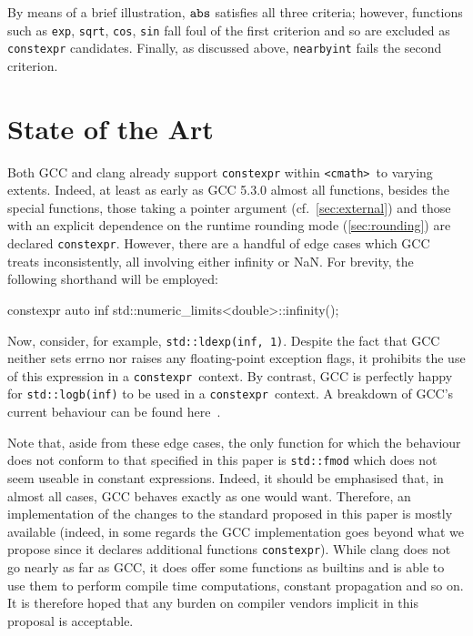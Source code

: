 \documentclass[prd,twocolumn,amsmath,amssymb,nofootinbib,eqsecnum]{revtex4-1}
\newcommand{\constexpr}{\code{constexpr}\xspace}
\newcommand{\code}[1]{{\tt #1}}
\newcommand{\header}[1]{{\tt <#1>}}
\newcommand{\cmath}{\header{cmath}}
\begin{document}
By means of a brief illustration, $\code{abs}$ satisfies all three criteria; however, functions such as 
\code{exp}, \code{sqrt}, \code{cos}, \code{sin} fall foul of the first criterion and so are excluded as 
\constexpr candidates. Finally, as discussed above, \code{nearbyint} fails the second criterion.


\section{State of the Art}

Both GCC and clang already support \constexpr within \cmath\ to varying extents. 
Indeed, at least as early as GCC 5.3.0 almost all functions, besides the special functions, those taking a pointer argument
(cf.~\ref{sec:external}) and those with an explicit dependence on the runtime rounding mode (\ref{sec:rounding}) are declared \constexpr. However, there are a handful of edge cases which GCC treats inconsistently, all involving either infinity or NaN. For brevity, the following shorthand will be employed:\vspace{3ex}
\begin{verbbox}
	constexpr auto inf{
	    std::numeric_limits<double>::infinity()};
\end{verbbox}
\theverbbox
\vspace{3ex}
Now, consider, for example, \code{std::ldexp(inf, 1)}. Despite the fact that GCC neither sets errno nor raises any floating-point exception flags, it prohibits the use of this expression in a \constexpr\ context. By contrast, GCC is perfectly happy for \code{std::logb(inf)} to be used in a \constexpr\ context. A breakdown of GCC's current behaviour can be found here~\cite{Blessed}.

Note that, aside from these edge cases, the only function for which the behaviour does not conform to that specified in this paper is \code{std::fmod} which does not seem useable in constant expressions.
Indeed, it should be emphasised that, in almost all cases, GCC behaves exactly as one would want. Therefore, an implementation of the changes to the standard proposed in this paper is mostly available (indeed, in some regards the GCC implementation goes beyond what we propose since it declares additional functions \constexpr).
While clang does not go nearly as far as GCC, it does offer some functions as 
builtins and is able to use them to perform compile time computations, constant
propagation and so on. It is therefore hoped that any burden on compiler vendors implicit in this
proposal is acceptable.
\end{document}
